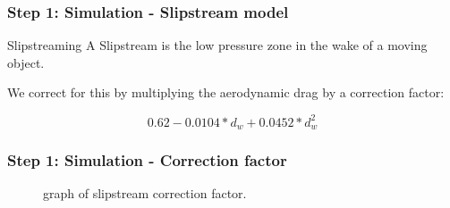 \documentclass{beamer}
\begin{document}
\begin{frame}
\frametitle{Step 1: Simulation - Slipstream model}
\begin{block}{Slipstreaming}
A Slipstream is the low pressure zone in the wake of a moving object. \newline \par
\pause
We correct for this by multiplying the aerodynamic drag by a correction factor:

$$ 0.62 - 0.0104*d_w + 0.0452*d_w^2 $$
\end{block}
\end{frame}

\begin{frame}
\frametitle{Step 1: Simulation - Correction factor}
\begin{figure}[ht!]
  \centering
    \scalebox{0.6}{}
  \caption{graph of slipstream correction factor.}
\end{figure}
\end{frame}
\end{document}
